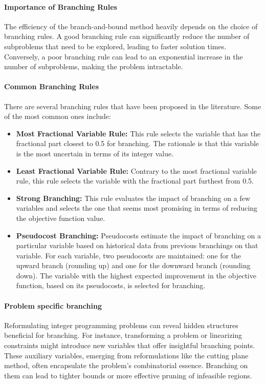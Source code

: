 \paragraph{Importance of Branching Rules}

The efficiency of the branch-and-bound method heavily depends on the choice of branching rules. A good branching rule can significantly reduce the number of subproblems that need to be explored, leading to faster solution times. Conversely, a poor branching rule can lead to an exponential increase in the number of subproblems, making the problem intractable.

\paragraph{Common Branching Rules}

There are several branching rules that have been proposed in the literature. Some of the most common ones include:

\begin{itemize}
    \item \textbf{Most Fractional Variable Rule:} This rule selects the variable that has the fractional part closest to 0.5 for branching. The rationale is that this variable is the most uncertain in terms of its integer value.
    
    \item \textbf{Least Fractional Variable Rule:} Contrary to the most fractional variable rule, this rule selects the variable with the fractional part furthest from 0.5.
    
    \item \textbf{Strong Branching:} This rule evaluates the impact of branching on a few variables and selects the one that seems most promising in terms of reducing the objective function value.
    
    \item \textbf{Pseudocost Branching:} Pseudocosts estimate the impact of branching on a particular variable based on historical data from previous branchings on that variable. For each variable, two pseudocosts are maintained: one for the upward branch (rounding up) and one for the downward branch (rounding down). The variable with the highest expected improvement in the objective function, based on its pseudocosts, is selected for branching.
\end{itemize}
\paragraph{Problem specific branching}
Reformulating integer programming problems can reveal hidden structures beneficial for branching. For instance, transforming a problem or linearizing constraints might introduce new variables that offer insightful branching points. These auxiliary variables, emerging from reformulations like the cutting plane method, often encapsulate the problem's combinatorial essence. Branching on them can lead to tighter bounds or more effective pruning of infeasible regions.

